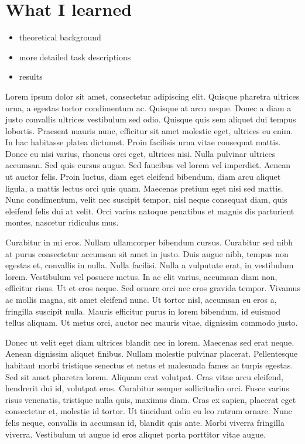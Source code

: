 \documentclass[../00_main.tex]{subfiles}
\begin{document}
\section{What I learned}

\begin{itemize}
    \item theoretical background
    \item more detailed task descriptions
    \item results
\end{itemize}

Lorem ipsum dolor sit amet, consectetur adipiscing elit. Quisque pharetra ultrices urna, a egestas tortor condimentum ac. Quisque at arcu neque. Donec a diam a justo convallis ultrices vestibulum sed odio. Quisque quis sem aliquet dui tempus lobortis. Praesent mauris nunc, efficitur sit amet molestie eget, ultrices eu enim. In hac habitasse platea dictumst. Proin facilisis urna vitae consequat mattis. Donec eu nisi varius, rhoncus orci eget, ultrices nisi. Nulla pulvinar ultrices accumsan. Sed quis cursus augue. Sed faucibus vel lorem vel imperdiet. Aenean ut auctor felis. Proin luctus, diam eget eleifend bibendum, diam arcu aliquet ligula, a mattis lectus orci quis quam. Maecenas pretium eget nisi sed mattis. Nunc condimentum, velit nec suscipit tempor, nisl neque consequat diam, quis eleifend felis dui at velit. Orci varius natoque penatibus et magnis dis parturient montes, nascetur ridiculus mus.

Curabitur in mi eros. Nullam ullamcorper bibendum cursus. Curabitur sed nibh at purus consectetur accumsan sit amet in justo. Duis augue nibh, tempus non egestas et, convallis in nulla. Nulla facilisi. Nulla a vulputate erat, in vestibulum lorem. Vestibulum vel posuere metus. In ac elit varius, accumsan diam non, efficitur risus. Ut et eros neque. Sed ornare orci nec eros gravida tempor. Vivamus ac mollis magna, sit amet eleifend nunc. Ut tortor nisl, accumsan eu eros a, fringilla suscipit nulla. Mauris efficitur purus in lorem bibendum, id euismod tellus aliquam. Ut metus orci, auctor nec mauris vitae, dignissim commodo justo.

Donec ut velit eget diam ultrices blandit nec in lorem. Maecenas sed erat neque. Aenean dignissim aliquet finibus. Nullam molestie pulvinar placerat. Pellentesque habitant morbi tristique senectus et netus et malesuada fames ac turpis egestas. Sed sit amet pharetra lorem. Aliquam erat volutpat. Cras vitae arcu eleifend, hendrerit dui id, volutpat eros. Curabitur semper sollicitudin orci. Fusce varius risus venenatis, tristique nulla quis, maximus diam. Cras ex sapien, placerat eget consectetur et, molestie id tortor. Ut tincidunt odio eu leo rutrum ornare. Nunc felis neque, convallis in accumsan id, blandit quis ante. Morbi viverra fringilla viverra. Vestibulum ut augue id eros aliquet porta porttitor vitae augue.
\end{document}
